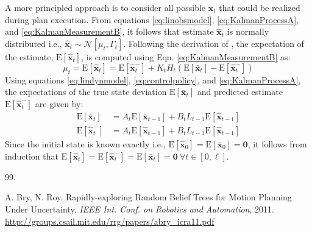 \documentclass[letterpaper]{article}
\renewenvironment{thebibliography}[1]{%
  \begin{oldthebibliography}{#1}%
    \setlength{\parskip}{0ex}%
    \setlength{\itemsep}{0ex}%
}%
{%
  \end{oldthebibliography}%
}
\begin{document}
A more principled approach is to consider all possible $\hat{\mathbf{x}}_t$ that could be realized during plan execution. From equations \ref{eq:linobsmodel}, \ref{eq:KalmanProcessA}, and \ref{eq:KalmanMeasurementB}, it follows that estimate $\hat{\mathbf{x}}_t$ is normally distributed i.e., $\hat{\mathbf{x}}_t \sim \mathcal{N}[\mu_t, \Gamma_t]$. Following the derivation of \cite{Bry11}, the expectation of the estimate, $\mathrm{E}[\hat{\mathbf{x}}_t]$, is computed using Eqn. \ref{eq:KalmanMeasurementB} as:
\begin{equation}
\mu_t = \mathrm{E}[\hat{\mathbf{x}}_t] 
= \mathrm{E}[\hat{\mathbf{x}}^{-}_{t}] + K_t H_t(\mathrm{E}[\bar{\mathbf{x}}_{t}] - \mathrm{E}[\hat{\mathbf{x}}^{-}_{t}])
\end{equation}
Using equations \ref{eq:lindynmodel}, \ref{eq:controlpolicy}, and \ref{eq:KalmanProcessA}, the expectations of the true state deviation $\mathrm{E}[\bar{\mathbf{x}}_{t}]$ and predicted estimate $\mathrm{E}[\hat{\mathbf{x}}^{-}_{t}]$ are given by:
\begin{align}
\mathrm{E}[\bar{\mathbf{x}}_{t}] &= A_t\mathrm{E}[\bar{\mathbf{x}}_{t-1}] + B_t L_{t-1}\mathrm{E}[\hat{\mathbf{x}}_{t-1}] \label{eq:exptrue} \\
\mathrm{E}[\hat{\mathbf{x}}^{-}_{t}] &= A_t\mathrm{E}[\hat{\mathbf{x}}_{t-1}] + B_t L_{t-1}\mathrm{E}[\hat{\mathbf{x}}_{t-1}] \label{eq:exppred}
\end{align}
Since the initial state is known exactly i.e., $\mathrm{E}[\hat{\mathbf{x}}_0] = \mathrm{E}[\bar{\mathbf{x}}_0] = \mathbf{0}$, it follows from induction that $\mathrm{E}[\hat{\mathbf{x}}_t] = \mathrm{E}[\hat{\mathbf{x}}^{-}_{t}] = \mathrm{E}[\bar{\mathbf{x}}_{t}] =  \mathbf{0} ~ \forall t \in [0,\ell]$.

\begin{thebibliography}{99.}
 A. Bry, N. Roy. Rapidly-exploring Random Belief Trees for Motion Planning Under Uncertainty. \emph{IEEE Int. Conf. on Robotics and Automation}, 2011. \url{http://groups.csail.mit.edu/rrg/papers/abry_icra11.pdf}

\end{thebibliography}
\end{document}
